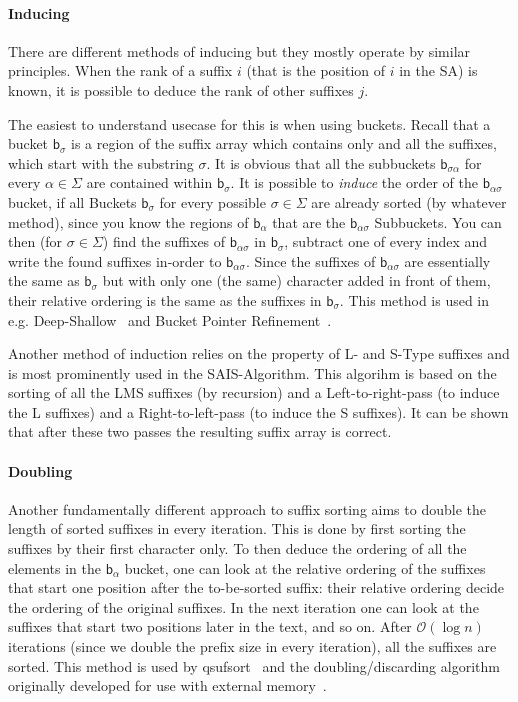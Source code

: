 \paragraph{Inducing} %
There are different methods of inducing but they mostly operate by similar principles.
When the rank of a suffix $i$ (that is the position of $i$ in the SA) is known,
it is possible to deduce the rank of other suffixes $j$.

The easiest to understand usecase for this is when using buckets.
Recall that a bucket $\mathsf b_{\sigma}$ is a region of the suffix
array which contains only and all the suffixes,
which start with the substring $\sigma$.
It is obvious that all the subbuckets $\mathsf b_{\sigma\alpha}$ for
every $\alpha \in \Sigma$ are contained within $\mathsf b_\sigma$.
It is possible to \emph{induce} the order of the $\mathsf b_{\alpha\sigma}$ bucket,
if all Buckets $\mathsf b_\sigma$ for every possible $\sigma \in \Sigma$ are already sorted (by whatever method),
since you know the regions of $\mathsf b_\alpha$ that are the $\mathsf b_{\alpha\sigma}$ Subbuckets.
You can then (for $\sigma \in \Sigma$) find the suffixes of $\mathsf b_{\alpha\sigma}$ in $\mathsf b_{\sigma}$,
subtract one of every index and write the found suffixes in-order to $\mathsf b_{\alpha\sigma}$.
Since the suffixes of $\mathsf b_{\alpha\sigma}$ are essentially the same as $\mathsf b_\sigma$ but
with only one (the same) character added in front of them,
their relative ordering is the same as the suffixes in $\mathsf b_\sigma$.
This method is used in e.g. Deep-Shallow~\cite{saca:4} and 
Bucket Pointer Refinement~\cite{saca:2}.

Another method of induction relies on the property of L- and S-Type suffixes and
is most prominently used in the SAIS-Algorithm.
This algorihm is based on the sorting of all the LMS suffixes (by recursion)
and a Left-to-right-pass (to induce the L suffixes)
and a Right-to-left-pass (to induce the S suffixes).
It can be shown that after these two passes the resulting suffix array is correct.

\paragraph{Doubling} Another fundamentally different approach to suffix sorting
aims to double the length of sorted suffixes in every iteration.
This is done by first sorting the suffixes by their first character only.
To then deduce the ordering of all the elements in the $\mathsf b_\alpha$ bucket,
one can look at the relative ordering of the suffixes that start one position
after the to-be-sorted suffix:
their relative ordering decide the ordering of the original suffixes.
In the next iteration one can look at the suffixes that start two positions later in the text,
and so on.
After $\mathcal O(\log n)$ iterations (since we double the prefix size in every iteration),
all the suffixes are sorted.
This method is used by qsufsort~\cite{qsufsort} and the
doubling/discarding algorithm originally developed for use with external memory~\cite{saca:11}.

